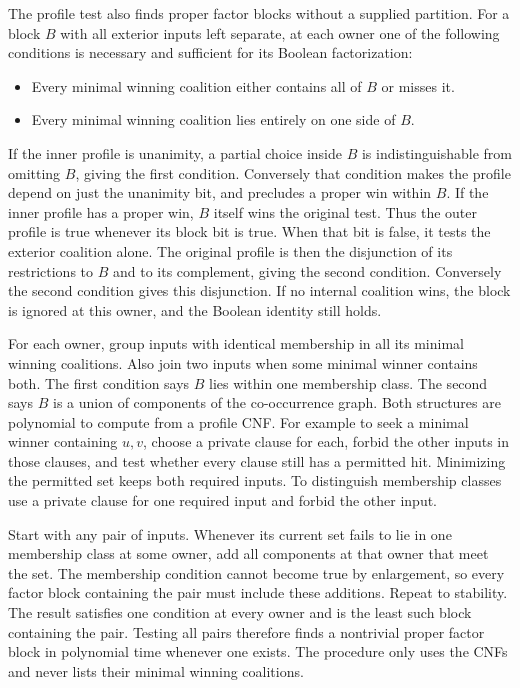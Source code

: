 The profile test also finds proper factor blocks
without a supplied partition. For a block $B$ with
all exterior inputs left separate, at each owner
one of the following conditions is necessary and
sufficient for its Boolean factorization:
\begin{itemize}
\item Every minimal winning coalition either contains
all of $B$ or misses it.
\item Every minimal winning coalition lies entirely
on one side of $B$.
\end{itemize}
If the inner profile is unanimity, a partial choice
inside $B$ is indistinguishable from omitting $B$,
giving the first condition. Conversely that condition
makes the profile depend on just the unanimity bit,
and precludes a proper win within $B$. If the inner
profile has a proper win, $B$ itself wins the original
test. Thus the outer profile is true whenever its
block bit is true. When that bit is false, it tests
the exterior coalition alone. The original profile
is then the disjunction of its restrictions to $B$
and to its complement, giving the second condition.
Conversely the second condition gives this disjunction.
If no internal coalition wins, the block is ignored
at this owner, and the Boolean identity still holds.

For each owner, group inputs with identical membership
in all its minimal winning coalitions. Also join two
inputs when some minimal winner contains both. The
first condition says $B$ lies within one membership
class. The second says $B$ is a union of components
of the co-occurrence graph. Both structures are
polynomial to compute from a profile CNF. For example
to seek a minimal winner containing $u,v$, choose
a private clause for each, forbid the other inputs
in those clauses, and test whether every clause still
has a permitted hit. Minimizing the permitted set
keeps both required inputs. To distinguish membership
classes use a private clause for one required input
and forbid the other input.

Start with any pair of inputs. Whenever its current
set fails to lie in one membership class at some
owner, add all components at that owner that meet
the set. The membership condition cannot become true
by enlargement, so every factor block containing the
pair must include these additions. Repeat to stability.
The result satisfies one condition at every owner and
is the least such block containing the pair. Testing
all pairs therefore finds a nontrivial proper factor
block in polynomial time whenever one exists. The
procedure only uses the CNFs and never lists their
minimal winning coalitions.

